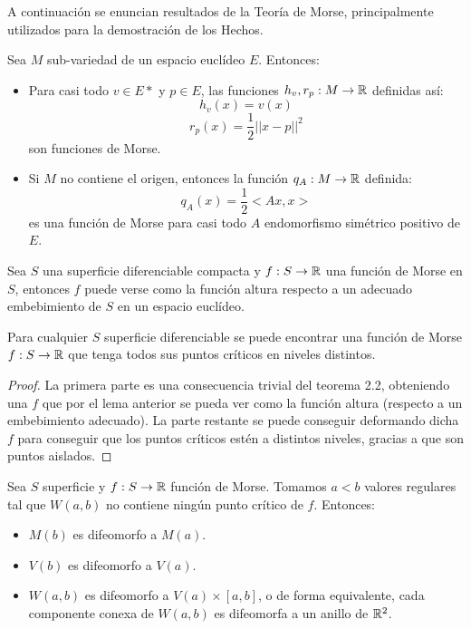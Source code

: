 
A continuación se enuncian resultados de la Teoría de Morse, principalmente utilizados para la demostración de los Hechos.

\begin{teorema}
	Sea $M$ sub-variedad de un espacio euclídeo $E$. Entonces:
	\begin{itemize}
		\item Para casi todo $v \in E*$ y $p \in E$, las funciones $h_v, r_p : M \rightarrow \mathbb{R}$ definidas así:
			$$h_v(x)=v(x)$$
			$$r_p(x)=\frac{1}{2}||x-p||^2$$
		son funciones de Morse.
		\item Si $M$ no contiene el origen, entonces la función $q_A: M \rightarrow \mathbb{R}$ definida:
			$$q_A(x)=\frac{1}{2}<Ax,x>$$
		es una función de Morse para casi todo $A$ endomorfismo simétrico positivo de $E$.
	\end{itemize}
\end{teorema}

\begin{lema}
	Sea $S$ una superficie diferenciable compacta y $f:S \rightarrow \mathbb{R}$ una función de Morse en $S$, entonces $f$ puede verse como la función altura respecto a un adecuado embebimiento de $S$ en un espacio euclídeo. 
\end{lema}

\begin{corolario}
	Para cualquier $S$ superficie diferenciable se puede encontrar una función de Morse $f:S \rightarrow \mathbb{R}$ que tenga todos sus puntos críticos en niveles distintos.
\end{corolario}

\begin{proof}
	La primera parte es una consecuencia trivial del teorema 2.2, obteniendo una $f$ que por el lema anterior se pueda ver como la función altura (respecto a un embebimiento adecuado). La parte restante se puede conseguir deformando dicha $f$ para conseguir que los puntos críticos estén a distintos niveles, gracias a que son puntos aislados.
\end{proof}

\begin{teorema}
	Sea $S$ superficie y $f: S \rightarrow \mathbb{R}$ función de Morse. Tomamos $a < b$ valores regulares tal que $W(a,b)$ no contiene ningún punto crítico de $f$. Entonces:
	\begin{itemize}
		\item $M(b)$ es difeomorfo a $M(a)$.
		\item $V(b)$ es difeomorfo a $V(a)$.
		\item $W(a,b)$ es difeomorfo a $V(a) \times [a,b]$, o de forma equivalente, cada componente conexa de $W(a,b)$ es difeomorfa a un anillo de $\mathbb{R}^2$.
	\end{itemize}
\end{teorema}

